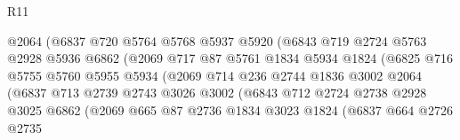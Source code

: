 \begin{lexlean}{R11}
\begin{coremodule}
                              @2064
                              (@6837
                                @720
                                @5764
                                @5768
                                @5937
                                @5920
                                (@6843
                                  @719
                                  @2724
                                  @5763
                                  @2928
                                  @5936
                                  @6862
                                  (@2069
                                    @717
                                    @87
                                    @5761
                                    @1834
                                    @5934
                                    @1824
                                    (@6825
                                      @716
                                      @5755
                                      @5760
                                      @5955
                                      @5934
                                      (@2069
                                        @714
                                        @236
                                        @2744
                                        @1836
                                        @3002
                                        @2064
                                        (@6837
                                          @713
                                          @2739
                                          @2743
                                          @3026
                                          @3002
                                          (@6843
                                            @712
                                            @2724
                                            @2738
                                            @2928
                                            @3025
                                            @6862
                                            (@2069
                                              @665
                                              @87
                                              @2736
                                              @1834
                                              @3023
                                              @1824
                                              (@6837
                                                @664
                                                @2726
                                                @2735

\end{coremodule}
\end{lexlean}

